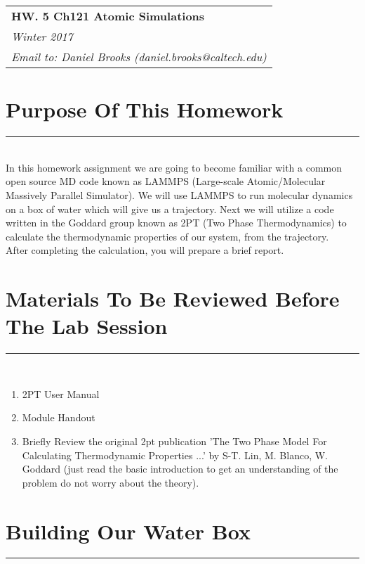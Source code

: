 \documentclass{article}
\begin{document}
\null\hfill\begin{tabular}[t]{l@{}}
  \textbf{HW. 5 Ch121 Atomic Simulations}\\
  \textit{Winter 2017}\\
  \textit{Email to: Daniel Brooks (daniel.brooks@caltech.edu)}
\end{tabular}
\vspace{10mm}

\noindent

\section*{Purpose Of This Homework}
\noindent\rule[0.5ex]{\linewidth}{1pt}\\

In this homework assignment we are going to become familiar with a common open source MD code known as LAMMPS (Large-scale Atomic/Molecular Massively Parallel Simulator). 
We will use LAMMPS to run molecular dynamics on a box of water which will give us a trajectory. 
Next we will utilize a code written in the Goddard group known as 2PT (Two Phase Thermodynamics) to calculate the thermodynamic properties of our system, from the trajectory. \\

After completing the calculation, you will prepare a brief report.\\

\section*{Materials To Be Reviewed Before The Lab Session}
\noindent\rule[0.5ex]{\linewidth}{1pt}\\

\begin{enumerate}
    \item 2PT User Manual
    \item Module Handout
    \item Briefly Review the original 2pt publication 'The Two Phase Model For Calculating Thermodynamic Properties ...' by S-T. Lin, M. Blanco, W. Goddard (just read the basic introduction to get an understanding of the problem do not worry about the theory).
\end{enumerate}

\section{Building Our Water Box}
\noindent\rule[0.5ex]{\linewidth}{1pt}\\
\end{document}
